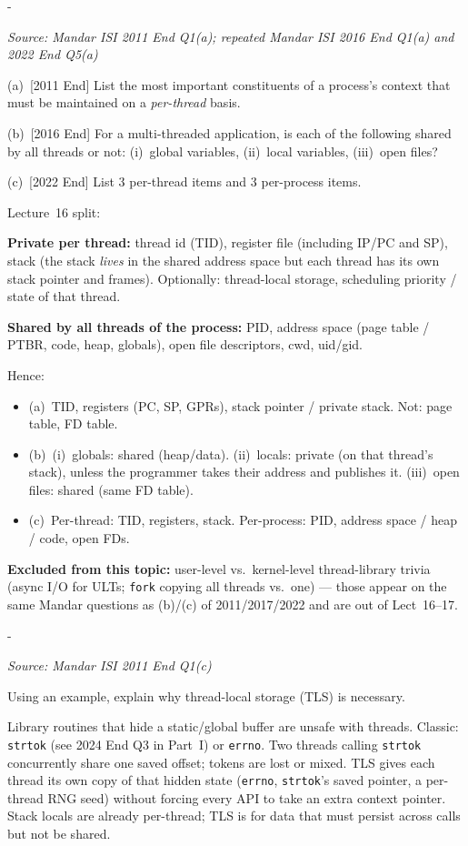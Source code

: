 \documentclass[11pt,a4paper]{article}
\makeatletter
\newcommand{\keepspace}[1]{\par\penalty-100\begingroup
  \setlength{\dimen@}{#1}\dimen@ii\pagegoal\advance\dimen@ii-\pagetotal
  \ifdim\dimen@>\dimen@ii\ifdim\dimen@ii>\z@\vfil\fi\break\fi\endgroup}
\newcounter{qn}[section]
\newenvironment{Qn}[4]{%
  \refstepcounter{qn}\keepspace{7\baselineskip}%
  \begin{tcolorbox}[qboxstyle, title={Q\thesection.\theqn\ \ [#1 \textbar\ #2]\ \ #4}]%
  {\footnotesize\color{g3}\textit{Source: #3}}\par\smallskip%
}{%
  \end{tcolorbox}%
}
\newenvironment{Sol}{%
  \begin{tcolorbox}[sboxstyle, title={Solution}]%
}{%
  \end{tcolorbox}\vspace{0.35em}%
}
\makeatother
\begin{document}
\begin{Qn}{Easy-Medium}{Lect 16}{Mandar ISI 2011 End Q1(a); repeated Mandar ISI 2016 End Q1(a) and 2022 End Q5(a)}{Shared versus private: process context vs.\ thread context}
(a)~[2011 End] List the most important constituents of a process's context that must be maintained on a \emph{per-thread} basis.

(b)~[2016 End] For a multi-threaded application, is each of the following shared by all threads or not: (i)~global variables, (ii)~local variables, (iii)~open files?

(c)~[2022 End] List 3 per-thread items and 3 per-process items.
\end{Qn}
\begin{Sol}
Lecture~16 split:

\textbf{Private per thread:} thread id (TID), register file (including IP/PC and SP), stack (the stack \emph{lives} in the shared address space but each thread has its own stack pointer and frames). Optionally: thread-local storage, scheduling priority / state of that thread.

\textbf{Shared by all threads of the process:} PID, address space (page table / PTBR, code, heap, globals), open file descriptors, cwd, uid/gid.

Hence:
\begin{itemize}
\item (a)~TID, registers (PC, SP, GPRs), stack pointer / private stack. Not: page table, FD table.
\item (b)~(i)~globals: shared (heap/data). (ii)~locals: private (on that thread's stack), unless the programmer takes their address and publishes it. (iii)~open files: shared (same FD table).
\item (c)~Per-thread: TID, registers, stack. Per-process: PID, address space / heap / code, open FDs.
\end{itemize}

\textbf{Excluded from this topic:} user-level vs.\ kernel-level thread-library trivia (async I/O for ULTs; \texttt{fork} copying all threads vs.\ one) --- those appear on the same Mandar questions as (b)/(c) of 2011/2017/2022 and are out of Lect~16--17.
\end{Sol}

\begin{Qn}{Easy-Medium}{Lect 16}{Mandar ISI 2011 End Q1(c)}{Why thread-local storage?}
Using an example, explain why thread-local storage (TLS) is necessary.
\end{Qn}
\begin{Sol}
Library routines that hide a static/global buffer are unsafe with threads. Classic: \texttt{strtok} (see 2024 End Q3 in Part~I) or \texttt{errno}. Two threads calling \texttt{strtok} concurrently share one saved offset; tokens are lost or mixed. TLS gives each thread its own copy of that hidden state (\texttt{errno}, \texttt{strtok}'s saved pointer, a per-thread RNG seed) without forcing every API to take an extra context pointer. Stack locals are already per-thread; TLS is for data that must persist across calls but not be shared.
\end{Sol}
\end{document}
